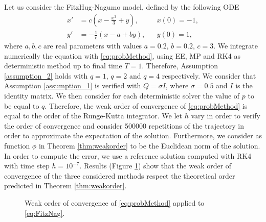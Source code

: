 Let us consider the FitzHug-Nagumo model, defined by the following ODE
\begin{equation}\label{eq:FitzNag}
\begin{aligned}
	x' &= c\left(x - \frac{x^3}{3} + y\right), && x(0) = -1, \\
	y' &= -\frac{1}{c}(x - a + by), && y(0) = 1,
\end{aligned}
\end{equation}
where $a, b, c$ are real parameters with values $a = 0.2$, $b = 0.2$, $c = 3$. We integrate numerically the equation with \eqref{eq:probMethod}, using EE, MP and RK4 as deterministic method up to final time $T = 1$. Therefore, Assumption \ref{assumption_2} holds with $q = 1$, $q = 2$ and $q = 4$ respectively. We consider that Assumption \ref{assumption_1} is verified with $Q = \sigma I$, where $\sigma = 0.5$ and $I$ is the identity matrix. We then consider for each deterministic solver the value of $p$ to be equal to $q$. Therefore, the weak order of convergence of \eqref{eq:probMethod} is equal to the order of the Runge-Kutta integrator. We let $h$ vary in order to verify the order of convergence and consider 500000 repetitions of the trajectory in order to approximate the expectation of the solution. Furthermore, we consider as function $\phi$ in Theorem \ref{thm:weakorder} to be the Euclidean norm of the solution. In order to compute the error, we use a reference solution computed with RK4 with time step $h = 10^{-7}$. Results (Figure \ref{fig:weakorder}) show that the weak order of convergence of the three considered methods respect the theoretical order predicted in Theorem \ref{thm:weakorder}.

\begin{figure}
\centering
\resizebox{0.6\linewidth}{!}{}
\caption{Weak order of convergence of \eqref{eq:probMethod} applied to \eqref{eq:FitzNag}.}
\label{fig:weakorder}
\end{figure}